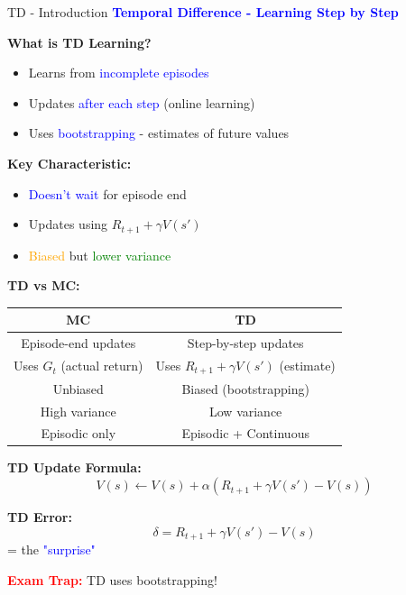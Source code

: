 \documentclass[8pt]{beamer}
\begin{document}
\begin{frame}{TD - Introduction}
\fontsize{6.5}{7.5}\selectfont
\textcolor{blue}{\textbf{Temporal Difference - Learning Step by Step}}

\textbf{What is TD Learning?}
\begin{itemize}
\item Learns from \textcolor{blue}{incomplete episodes}
\item Updates \textcolor{blue}{after each step} (online learning)
\item Uses \textcolor{blue}{bootstrapping} - estimates of future values
\end{itemize}

\textbf{Key Characteristic:}
\begin{itemize}
\item \textcolor{blue}{Doesn't wait} for episode end
\item Updates using $R_{t+1} + \gamma V(s')$
\item \textcolor{orange}{Biased} but \textcolor{green}{lower variance}
\end{itemize}

\textbf{TD vs MC:}
\begin{tabular}{|c|c|}
\hline
MC & TD \\
\hline
Episode-end updates & Step-by-step updates \\
\hline
Uses $G_t$ (actual return) & Uses $R_{t+1} + \gamma V(s')$ (estimate) \\
\hline
Unbiased & Biased (bootstrapping) \\
\hline
High variance & Low variance \\
\hline
Episodic only & Episodic + Continuous \\
\hline
\end{tabular}

\textbf{TD Update Formula:}
\[
V(s) \leftarrow V(s) + \alpha(R_{t+1} + \gamma V(s') - V(s))
\]

\textbf{TD Error:}
\[
\delta = R_{t+1} + \gamma V(s') - V(s)
\]
= the \textcolor{blue}{"surprise"}

\textcolor{red}{\textbf{Exam Trap:}} TD uses bootstrapping!
\end{frame}
\end{document}
